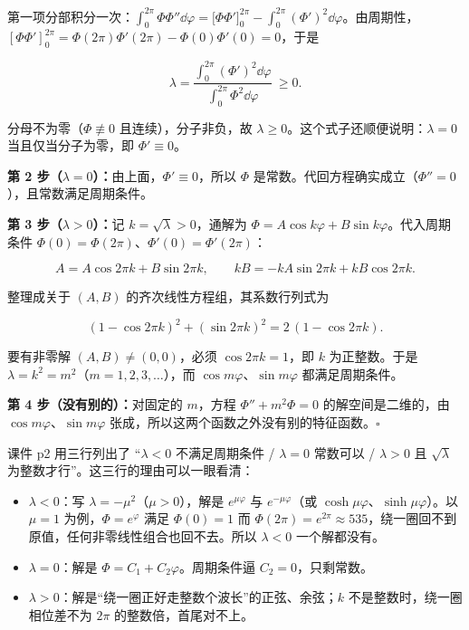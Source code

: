第一项分部积分一次：$\displaystyle\int_0^{2\pi}\Phi\Phi''\dd\varphi=\big[\Phi\Phi'\big]_0^{2\pi}-\int_0^{2\pi}(\Phi')^2\dd\varphi$。由周期性，$[\Phi\Phi']_0^{2\pi}=\Phi(2\pi)\Phi'(2\pi)-\Phi(0)\Phi'(0)=0$，于是

\begin{equation}
\lambda=\frac{\displaystyle\int_0^{2\pi}(\Phi')^2\dd\varphi}{\displaystyle\int_0^{2\pi}\Phi^2\dd\varphi}\ \ge0 .
\label{eq:rayleigh}
\end{equation}

分母不为零（$\Phi\not\equiv0$ 且连续），分子非负，故 $\lambda\ge0$。这个式子还顺便说明：$\lambda=0$ 当且仅当分子为零，即 $\Phi'\equiv0$。

\textbf{第 2 步（$\lambda=0$）：}由上面，$\Phi'\equiv0$，所以 $\Phi$ 是常数。代回方程确实成立（$\Phi''=0$），且常数满足周期条件。

\textbf{第 3 步（$\lambda>0$）：}记 $k=\sqrt\lambda>0$，通解为 $\Phi=A\cos k\varphi+B\sin k\varphi$。代入周期条件 $\Phi(0)=\Phi(2\pi)$、$\Phi'(0)=\Phi'(2\pi)$：

\[
A=A\cos2\pi k+B\sin2\pi k,\qquad kB=-kA\sin2\pi k+kB\cos2\pi k .
\]

整理成关于 $(A,B)$ 的齐次线性方程组，其系数行列式为

\[
(1-\cos2\pi k)^2+(\sin2\pi k)^2=2\,(1-\cos2\pi k).
\]

要有非零解 $(A,B)\ne(0,0)$，必须 $\cos2\pi k=1$，即 $k$ 为正整数。于是 $\lambda=k^2=m^2$（$m=1,2,3,\dots$），而 $\cos m\varphi$、$\sin m\varphi$ 都满足周期条件。

\textbf{第 4 步（没有别的）：}对固定的 $m$，方程 $\Phi''+m^2\Phi=0$ 的解空间是二维的，由 $\cos m\varphi$、$\sin m\varphi$ 张成，所以这两个函数之外没有别的特征函数。$\square$


课件 p2 用三行列出了 “$\lambda<0$ 不满足周期条件 / $\lambda=0$ 常数可以 / $\lambda>0$ 且 $\sqrt\lambda$ 为整数才行”。这三行的理由可以一眼看清：

\begin{itemize}
  \item $\lambda<0$：写 $\lambda=-\mu^2$（$\mu>0$），解是 $e^{\mu\varphi}$ 与 $e^{-\mu\varphi}$（或 $\cosh\mu\varphi$、$\sinh\mu\varphi$）。以 $\mu=1$ 为例，$\Phi=e^{\varphi}$ 满足 $\Phi(0)=1$ 而 $\Phi(2\pi)=e^{2\pi}\approx535$，绕一圈回不到原值，任何非零线性组合也回不去。所以 $\lambda<0$ 一个解都没有。
  \item $\lambda=0$：解是 $\Phi=C_1+C_2\varphi$。周期条件逼 $C_2=0$，只剩常数。
  \item $\lambda>0$：解是“绕一圈正好走整数个波长”的正弦、余弦；$k$ 不是整数时，绕一圈相位差不为 $2\pi$ 的整数倍，首尾对不上。
\end{itemize}

